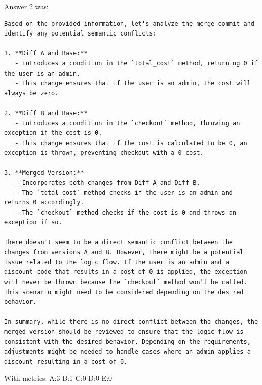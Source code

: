Answer 2 was:
\begin{lstlisting}
Based on the provided information, let's analyze the merge commit and identify any potential semantic conflicts:

1. **Diff A and Base:**
   - Introduces a condition in the `total_cost` method, returning 0 if the user is an admin.
   - This change ensures that if the user is an admin, the cost will always be zero.

2. **Diff B and Base:**
   - Introduces a condition in the `checkout` method, throwing an exception if the cost is 0.
   - This change ensures that if the cost is calculated to be 0, an exception is thrown, preventing checkout with a 0 cost.

3. **Merged Version:**
   - Incorporates both changes from Diff A and Diff B.
   - The `total_cost` method checks if the user is an admin and returns 0 accordingly.
   - The `checkout` method checks if the cost is 0 and throws an exception if so.

There doesn't seem to be a direct semantic conflict between the changes from versions A and B. However, there might be a potential issue related to the logic flow. If the user is an admin and a discount code that results in a cost of 0 is applied, the exception will never be thrown because the `checkout` method won't be called. This scenario might need to be considered depending on the desired behavior.

In summary, while there is no direct conflict between the changes, the merged version should be reviewed to ensure that the logic flow is consistent with the desired behavior. Depending on the requirements, adjustments might be needed to handle cases where an admin applies a discount resulting in a cost of 0.
\end{lstlisting}

With metrics:
A:3
B:1
C:0
D:0
E:0

